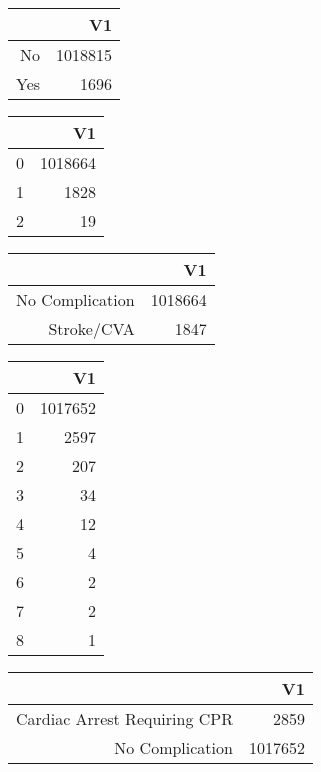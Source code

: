 \bigskip\bigskip
\centering
\begin{tabular}{rr}
  \hline
 & V1 \\ 
  \hline
No & 1018815 \\ 
  Yes & 1696 \\ 
   \hline
\end{tabular}

\bigskip\bigskip
\centering
\begin{tabular}{rr}
  \hline
 & V1 \\ 
  \hline
0 & 1018664 \\ 
  1 & 1828 \\ 
  2 &  19 \\ 
   \hline
\end{tabular}

\bigskip\bigskip
\centering
\begin{tabular}{rr}
  \hline
 & V1 \\ 
  \hline
No Complication & 1018664 \\ 
  Stroke/CVA & 1847 \\ 
   \hline
\end{tabular}

\bigskip\bigskip
\centering
\begin{tabular}{rr}
  \hline
 & V1 \\ 
  \hline
0 & 1017652 \\ 
  1 & 2597 \\ 
  2 & 207 \\ 
  3 &  34 \\ 
  4 &  12 \\ 
  5 &   4 \\ 
  6 &   2 \\ 
  7 &   2 \\ 
  8 &   1 \\ 
   \hline
\end{tabular}

\bigskip\bigskip
\centering
\begin{tabular}{rr}
  \hline
 & V1 \\ 
  \hline
Cardiac Arrest Requiring CPR & 2859 \\ 
  No Complication & 1017652 \\ 
   \hline
\end{tabular}

